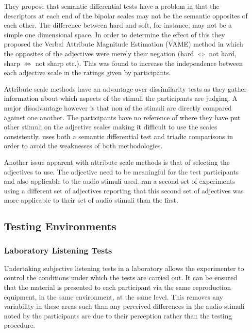 			They propose that semantic differential tests have a problem in that the descriptors at each end of
			the bipolar scales may not be the semantic opposites of each other. The difference between hard and
			soft, for instance, may not be a simple one dimensional space. In order to determine the effect of
			this they proposed the Verbal Attribute Magnitude Estimation (VAME) method in which the opposites of
			the adjectives were merely their negation (hard $\Leftrightarrow$ not hard, sharp $\Leftrightarrow$
			not sharp etc.). This was found to increase the independence between each adjective scale in the
			ratings given by participants. 

			Attribute scale methods have an advantage over dissimilarity tests as they gather information about
			which aspects of the stimuli the participants are judging. A major disadvantage however is that non
			of the stimuli are directly compared against one another. The participants have no reference of
			where they have put other stimuli on the adjective scales making it difficult to use the scales
			consistently. \citet{marui2005constructing} uses both a semantic differential test and triadic
			comparisons in order to avoid the weaknesses of both methodologies. 
			
			Another issue apparent with attribute scale methods is that of selecting the adjectives to use. The
			adjective need to be meaningful for the test participants and also applicable to the audio stimuli
			used. \citet{kendall1993verbal2} ran a second set of experiments using a different set of
			adjectives reporting that this second set of adjectives was more applicable to their set of audio
			stimuli than the first.

	\subsection{Testing Environments}
	\label{sec:Timbre-ListeningTests-Environments}

		\subsubsection*{Laboratory Listening Tests}
			Undertaking subjective listening tests in a laboratory allows the experimenter to control the
			conditions under which the tests are carried out. It can be ensured that the material is presented
			to each participant via the same reproduction equipment, in the same environment, at the same level.
			This removes any variability in these areas such than any perceived differences in the audio stimuli
			noted by the participants are due to their perception rather than the testing procedure.

